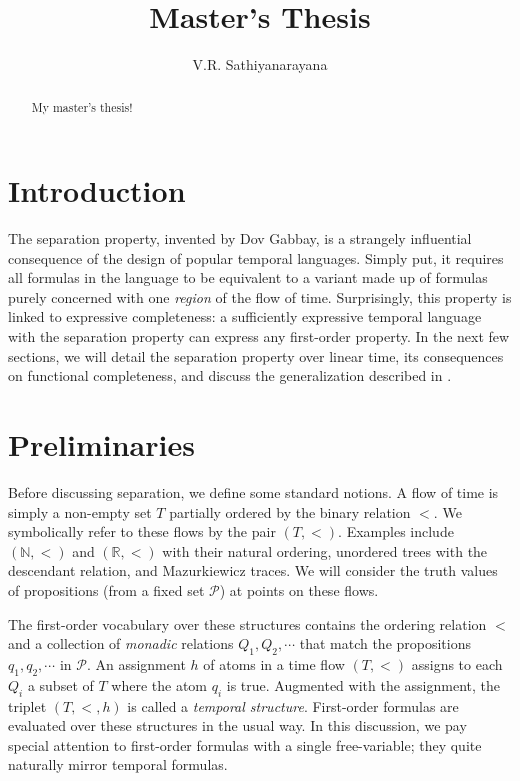 \documentclass[a4paper,UKenglish,cleveref, autoref, thm-restate]{lipics-v2021}
\title{Master's Thesis} %
\author{V.R. Sathiyanarayana}{Chennai Mathematical Institute, India \and \url{http://sathiyavrs.netlify.app}}{sathiyanarayana@cmi.ac.in}{}{}%
\begin{document}
\maketitle

\begin{abstract}
My master's thesis!
\end{abstract}

\section{Introduction}
\label{sec:introduction}

The separation property, invented by Dov Gabbay, is a strangely influential consequence of the design of popular temporal languages. Simply put, it requires all formulas in the language to be equivalent to a variant made up of formulas purely concerned with one \textit{region} of the flow of time. Surprisingly, this property is linked to expressive completeness: a sufficiently expressive temporal language with the separation property can express any first-order property. In the next few sections, we will detail the separation property over linear time, its consequences on functional completeness, and discuss the generalization described in \cite{gabbay1994}.

\section{Preliminaries}

Before discussing separation, we define some standard notions. A flow of time is simply a non-empty set $T$ partially ordered by the binary relation $<$. We symbolically refer to these flows by the pair $(T, <)$. Examples include $(\mathbb{N}, <)$ and $(\mathbb{R}, <)$ with their natural ordering, unordered trees with the descendant relation, and Mazurkiewicz traces. We will consider the truth values of propositions (from a fixed set $\mathcal{P}$) at points on these flows.

The first-order vocabulary over these structures contains the ordering relation $<$ and a collection of \textit{monadic} relations $Q_1, Q_2, \cdots$ that match the propositions $q_1, q_2, \cdots$ in $\mathcal{P}$. An assignment $h$ of atoms in a time flow $(T, <)$ assigns to each $Q_i$ a subset of $T$ where the atom $q_i$ is true. Augmented with the assignment, the triplet $(T, <, h)$ is called a \textit{temporal structure}. First-order formulas are evaluated over these structures in the usual way. In this discussion, we pay special attention to first-order formulas with a single free-variable; they quite naturally mirror temporal formulas.
\end{document}
